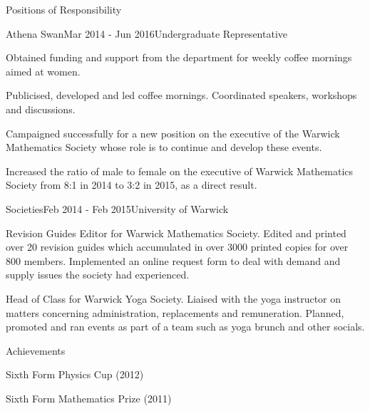 \documentclass{resume} %
\begin{document}
\begin{rSection}{Positions of Responsibility}


\begin{rSubsection}{Athena Swan}{Mar 2014 - Jun 2016}{Undergraduate Representative}{}
	\item Obtained funding and support from the department for weekly coffee mornings aimed at women. 
	\item Publicised, developed and led coffee mornings. Coordinated speakers, workshops and discussions.
	\item Campaigned successfully for a new position on the executive of the Warwick Mathematics Society whose role is to continue and develop these events. 
	\item Increased the ratio of male to female on the executive of Warwick Mathematics Society from 8:1 in 2014 to 3:2 in 2015, as a direct result.
\end{rSubsection}


\begin{rSubsection}{Societies}{Feb 2014 - Feb 2015}{University of Warwick}{}
\item Revision Guides Editor for Warwick Mathematics Society. Edited and printed over 20 revision guides which accumulated in over 3000 printed copies for over 800 members. Implemented an online request form to deal with demand and supply issues the society had experienced.
\item Head of Class for Warwick Yoga Society. Liaised with the yoga instructor on matters concerning administration, replacements and remuneration. Planned, promoted and ran events as part of a team such as yoga brunch and other socials.
\end{rSubsection}
\end{rSection}
\iffalse
\begin{rSection}{Achievements}

\begin{sSubsection}{}{}{}{}
\item Sixth Form Physics Cup (2012)
\item Sixth Form Mathematics Prize (2011)
\end{sSubsection}

\end{rSection}
\end{document}
